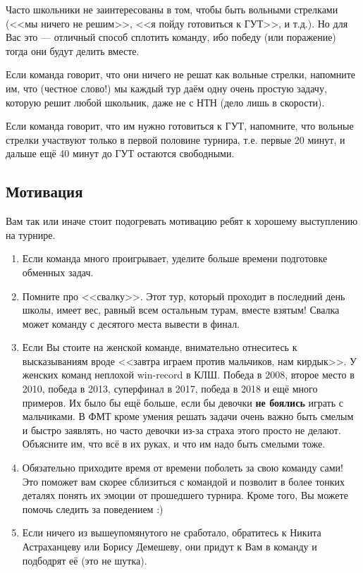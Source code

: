 \documentclass[12pt]{article}
\begin{document}
Часто школьники не заинтересованы в том, чтобы быть вольными стрелками (<<мы ничего не решим>>, <<я пойду готовиться к ГУТ>>, и т.д.). Но для Вас это --- отличный способ сплотить команду, ибо победу (или поражение) тогда они будут делить вместе.

Если команда говорит, что они ничего не решат как вольные стрелки, напомните им, что (честное слово!) мы каждый тур даём одну очень простую задачу, которую решит любой школьник, даже не с НТН (дело лишь в скорости). 

Если команда говорит, что им нужно готовиться к ГУТ, напомните, что вольные стрелки участвуют только в первой половине турнира, т.е. первые 20 минут, и дальше ещё 40 минут до ГУТ остаются свободными.

\subsection*{Мотивация}
Вам так или иначе стоит подогревать мотивацию ребят к хорошему выступлению на турнире. 
\begin{enumerate}
	\item Если команда много проигрывает, уделите больше времени подготовке обменных задач.
	\item Помните про <<свалку>>. Этот тур, который проходит в последний день школы, имеет вес, равный всем остальным турам, вместе взятым! Свалка может команду с десятого места вывести в финал. 
	\item Если Вы стоите на женской команде, внимательно отнеситесь к высказываниям вроде <<завтра играем против мальчиков, нам кирдык>>. У женских команд неплохой win-record в КЛШ. Победа в 2008, второе место в 2010, победа в 2013, суперфинал в 2017, победа в 2018 и ещё много примеров. Их было бы ещё больше, если бы девочки {\bf не боялись} играть с мальчиками. В ФМТ кроме умения решать задачи очень важно быть смелым и быстро заявлять, но часто девочки из-за страха этого просто не делают. Объясните им, что всё в их руках, и что им надо быть смелыми тоже.
	\item Обязательно приходите время от времени поболеть за свою команду сами! Это поможет вам скорее сблизиться с командой и позволит в более тонких деталях понять их эмоции от прошедшего турнира. Кроме того, Вы можете помочь следить за поведением :)
	\item Если ничего из вышеупомянутого не сработало, обратитесь к Никита Астраханцеву или Борису Демешеву, они придут к Вам в команду и подбодрят её (это не шутка).
\end{enumerate}
\end{document}
